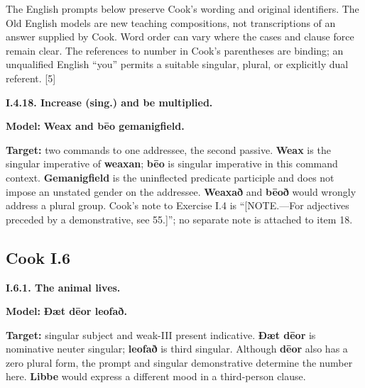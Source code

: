 The English prompts below preserve Cook’s wording and original identifiers. The Old English models are new teaching compositions, not transcriptions of an answer supplied by Cook. Word order can vary where the cases and clause force remain clear. The references to number in Cook’s parentheses are binding; an unqualified English “you” permits a suitable singular, plural, or explicitly dual referent. [5]

\par\begin{minipage}{\linewidth}\raggedright
\textbf{I.4.18. Increase (sing.) and be multiplied.}

\textbf{Model:} \textbf{Weax and bēo gemanigfield.}

\textbf{Target:} two commands to one addressee, the second passive. \textbf{Weax} is the singular imperative of \textbf{weaxan}; \textbf{bēo} is singular imperative in this command context. \textbf{Gemanigfield} is the uninflected predicate participle and does not impose an unstated gender on the addressee. \textbf{Weaxað} and \textbf{bēoð} would wrongly address a plural group. Cook’s note to Exercise I.4 is “[NOTE.—For adjectives preceded by a demonstrative, see 55.]”; no separate note is attached to item 18.

\end{minipage}\par\addvspace{4pt}

\subsection*{Cook I.6}

\par\begin{minipage}{\linewidth}\raggedright
\textbf{I.6.1. The animal lives.}

\textbf{Model:} \textbf{Ðæt dēor leofað.}

\textbf{Target:} singular subject and weak-III present indicative. \textbf{Ðæt dēor} is nominative neuter singular; \textbf{leofað} is third singular. Although \textbf{dēor} also has a zero plural form, the prompt and singular demonstrative determine the number here. \textbf{Libbe} would express a different mood in a third-person clause.

\end{minipage}\par\addvspace{4pt}

